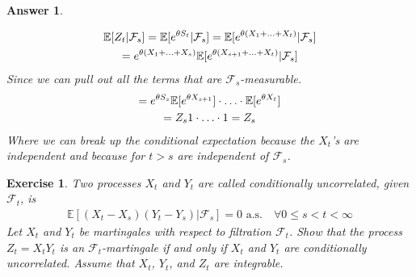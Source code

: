 \documentclass[12pt]{article}
\theoremstyle{colon}
\newtheorem{exercise}{Exercise}
\newtheorem*{answer}{Answer}
\begin{document}
\begin{answer}
\begin{enumerate}[label=\alph*)]
      \begin{gather*}
        \mathbb{E}[Z_t | \mathcal{F}_s] = \mathbb{E}[e^{\theta S_t} | \mathcal{F}_s] = \mathbb{E}[e^{\theta (X_1 + \mathellipsis + X_t)} | \mathcal{F}_s] \\
        = e^{\theta (X_1 + \mathellipsis + X_s)} \mathbb{E}[e^{\theta (X_{s+1} + \mathellipsis + X_t)} | \mathcal{F}_s]
      \end{gather*}
      Since we can pull out all the terms that are $\mathcal{F}_s$-measurable.
      \begin{gather*}
        = e^{\theta S_s} \mathbb{E}[e^{\theta X_{s+1}}] \cdot \mathellipsis \cdot \mathbb{E}[e^{\theta X_t}] \\
        = Z_s 1 \cdot \mathellipsis \cdot 1 = Z_s
      \end{gather*}
      Where we can break up the conditional expectation because the $X_t$'s are independent and because for $t > s$ are independent of $\mathcal{F}_s$.
  \end{enumerate}
\end{answer}

\clearpage

\begin{exercise}
  Two processes $X_t$ and $Y_t$ are called conditionally uncorrelated, given $\mathcal{F}_t$, is
  \begin{gather*}
    \mathbb{E}[(X_t - X_s)(Y_t - Y_s) | \mathcal{F}_s] = 0 \text{ a.s.} \quad \forall 0 \leq s < t < \infty
  \end{gather*}
  Let $X_t$ and $Y_t$ be martingales with respect to filtration $\mathcal{F}_t$. Show that the process $Z_t = X_t Y_t$ is an $\mathcal{F}_t$-martingale if and only if $X_t$ and $Y_t$ are conditionally uncorrelated. Assume that $X_t$, $Y_t$, and $Z_t$ are integrable.
\end{exercise}
\end{document}
